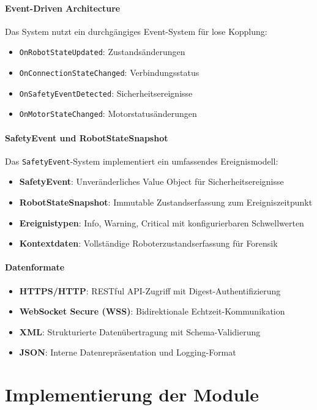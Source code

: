 \paragraph{Event-Driven Architecture}
Das System nutzt ein durchgängiges Event-System für lose Kopplung:
\begin{itemize}
    \item \texttt{OnRobotStateUpdated}: Zustandsänderungen
    \item \texttt{OnConnectionStateChanged}: Verbindungsstatus
    \item \texttt{OnSafetyEventDetected}: Sicherheitsereignisse
    \item \texttt{OnMotorStateChanged}: Motorstatusänderungen
\end{itemize}

\paragraph{SafetyEvent und RobotStateSnapshot}
Das \texttt{SafetyEvent}-System implementiert ein umfassendes Ereignismodell:
\begin{itemize}
    \item \textbf{SafetyEvent}: Unveränderliches Value Object für Sicherheitsereignisse
    \item \textbf{RobotStateSnapshot}: Immutable Zustandserfassung zum Ereigniszeitpunkt
    \item \textbf{Ereignistypen}: Info, Warning, Critical mit konfigurierbaren Schwellwerten
    \item \textbf{Kontextdaten}: Vollständige Roboterzustandserfassung für Forensik
\end{itemize}

\paragraph{Datenformate}
\begin{itemize}
    \item \textbf{HTTPS/HTTP}: RESTful API-Zugriff mit Digest-Authentifizierung
    \item \textbf{WebSocket Secure (WSS)}: Bidirektionale Echtzeit-Kommunikation
    \item \textbf{XML}: Strukturierte Datenübertragung mit Schema-Validierung
    \item \textbf{JSON}: Interne Datenrepräsentation und Logging-Format
\end{itemize}

\section{Implementierung der Module}

